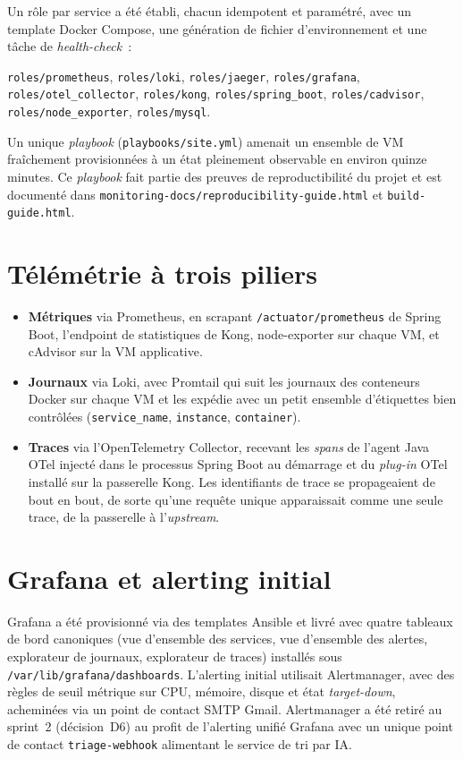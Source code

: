\documentclass[11pt,a4paper,oneside]{report}
\begin{document}
Un rôle par service a été établi, chacun idempotent et paramétré,
avec un template Docker Compose, une génération de fichier
d'environnement et une tâche de \emph{health-check}~:

\texttt{roles/prometheus}, \texttt{roles/loki}, \texttt{roles/jaeger},
\texttt{roles/grafana}, \texttt{roles/otel\_collector},
\texttt{roles/kong}, \texttt{roles/spring\_boot},
\texttt{roles/cadvisor}, \texttt{roles/node\_exporter},
\texttt{roles/mysql}.

Un unique \emph{playbook} (\texttt{playbooks/site.yml}) amenait un
ensemble de VM fraîchement provisionnées à un état pleinement
observable en environ quinze minutes. Ce \emph{playbook} fait partie
des preuves de reproductibilité du projet et est documenté dans
\texttt{monitoring-docs/reproducibility-guide.html} et
\texttt{build-guide.html}.

\section{Télémétrie à trois piliers}

\begin{itemize}
  \item \textbf{Métriques} via Prometheus, en scrapant
        \texttt{/actuator/prometheus} de Spring Boot, l'endpoint de
        statistiques de Kong, node-exporter sur chaque VM, et
        cAdvisor sur la VM applicative.
  \item \textbf{Journaux} via Loki, avec Promtail qui suit les
        journaux des conteneurs Docker sur chaque VM et les expédie
        avec un petit ensemble d'étiquettes bien contrôlées
        (\texttt{service\_name}, \texttt{instance},
        \texttt{container}).
  \item \textbf{Traces} via l'OpenTelemetry Collector, recevant les
        \emph{spans} de l'agent Java OTel injecté dans le processus
        Spring Boot au démarrage et du \emph{plug-in} OTel installé
        sur la passerelle Kong. Les identifiants de trace se
        propageaient de bout en bout, de sorte qu'une requête
        unique apparaissait comme une seule trace, de la passerelle
        à l'\emph{upstream}.
\end{itemize}

\section{Grafana et alerting initial}

Grafana a été provisionné via des templates Ansible et livré avec
quatre tableaux de bord canoniques (vue d'ensemble des services,
vue d'ensemble des alertes, explorateur de journaux, explorateur de
traces) installés sous \texttt{/var/lib/grafana/dashboards}. L'alerting
initial utilisait Alertmanager, avec des règles de seuil métrique
sur CPU, mémoire, disque et état \emph{target-down}, acheminées via
un point de contact SMTP Gmail. Alertmanager a été retiré au
sprint~2 (décision~D6) au profit de l'alerting unifié Grafana avec
un unique point de contact \texttt{triage-webhook} alimentant le
service de tri par IA.
\end{document}
